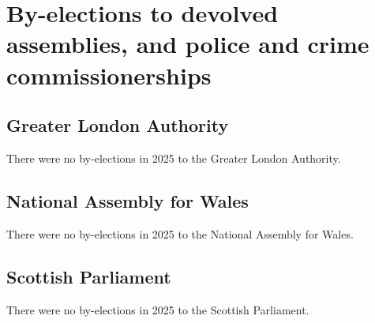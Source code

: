 \documentclass[a4paper,openany]{book}
\begin{document}
\chapter{By-elections to devolved assemblies, and police and crime commissionerships}

\section{Greater London Authority}

There were no by-elections in 2025 to the Greater London Authority.


\section{National Assembly for Wales}

There were no by-elections in 2025 to the National Assembly for Wales.


\section{Scottish Parliament}

There were no by-elections in 2025 to the Scottish Parliament.

%
%
%
\end{document}
